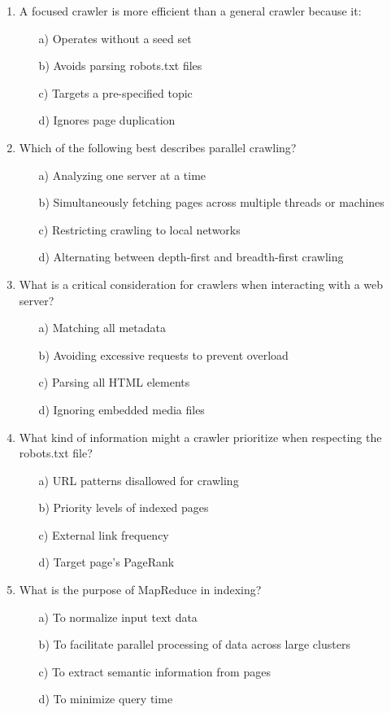 \documentclass[8pt]{extarticle}
\begin{document}
\begin{multicols}{2}
\begin{enumerate}
\item A focused crawler is more efficient than a general crawler because it:
\begin{itemize}
\item[a)] Operates without a seed set
\item[b)] Avoids parsing robots.txt files
\item[c)] Targets a pre-specified topic
\item[d)] Ignores page duplication
\end{itemize}

\item Which of the following best describes parallel crawling?
\begin{itemize}
\item[a)] Analyzing one server at a time
\item[b)] Simultaneously fetching pages across multiple threads or machines
\item[c)] Restricting crawling to local networks
\item[d)] Alternating between depth-first and breadth-first crawling
\end{itemize}

\item What is a critical consideration for crawlers when interacting with a web server?
\begin{itemize}
\item[a)] Matching all metadata
\item[b)] Avoiding excessive requests to prevent overload
\item[c)] Parsing all HTML elements
\item[d)] Ignoring embedded media files
\end{itemize}

\item What kind of information might a crawler prioritize when respecting the robots.txt file?
\begin{itemize}
\item[a)] URL patterns disallowed for crawling
\item[b)] Priority levels of indexed pages
\item[c)] External link frequency
\item[d)] Target page's PageRank
\end{itemize}

\item What is the purpose of MapReduce in indexing?
\begin{itemize}
\item[a)] To normalize input text data
\item[b)] To facilitate parallel processing of data across large clusters
\item[c)] To extract semantic information from pages
\item[d)] To minimize query time
\end{itemize}


\end{enumerate}
\end{multicols}
\end{document}
